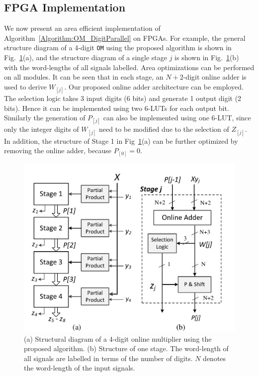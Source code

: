 \documentclass[conference]{IEEEtran}
\begin{document}
\subsection{FPGA Implementation}
We now present an area efficient implementation of Algorithm~\ref{Algorithm:OM_DigitParallel} on FPGAs. For example, the general structure diagram of a 4-digit \texttt{OM} using the proposed algorithm is shown in Fig.~\ref{Fig:PMStructure}(a), and the structure diagram of a single stage $j$ is shown in Fig.~\ref{Fig:PMStructure}(b) with the word-lengths of all signals labelled. Area optimizations can be performed on all modules. It can be seen that in each stage, an $N+2$-digit online adder is used to derive $W_{[j]}$. Our proposed online adder architecture can be employed. The selection logic takes 3 input digits (6 bits) and generate 1 output digit (2 bits). Hence it can be implemented using two 6-LUTs for each output bit. Similarly the generation of $P_{[j]}$ can also be implemented using one 6-LUT, since only the integer digits of $W_{[j]}$ need to be modified due to the selection of $Z_{[j]}$. In addition, the structure of Stage 1 in Fig~\ref{Fig:PMStructure}(a) can be further optimized by removing the online adder, because $P_{[0]}=0$.
%
\begin{figure}[tbp]
	\centering
	\includegraphics[width=.5\textwidth]{./Figures/ParallelMult_Structure.pdf}
	\caption{(a) Structural diagram of a 4-digit online multiplier using the proposed algorithm. (b) Structure of one stage. The word-length of all signals are labelled in terms of the number of digits. $N$ denotes the word-length of the input signals.}
	\label{Fig:PMStructure}
	\vspace{-1ex}
\end{figure}
\end{document}
